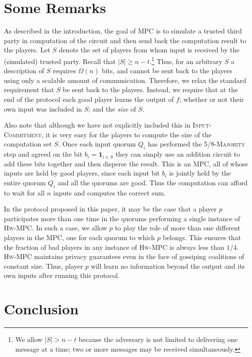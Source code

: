 \documentclass[10pt]{llncs}
\newcommand{\thresh}{5/8\xspace}
\newcommand{\hw}{\textsc{Hw-MPC}\xspace}
\newcommand{\ic}{\textsc{Input-Commitment}\xspace}
\newcommand{\maj}{\thresh-\textsc{Majority}\xspace}
\begin{document}
\section{Some Remarks} 
\label{s:dis}
As described in the introduction, the goal of MPC is to simulate a
trusted third party in computation of the circuit and then send back
the computation result to the players.  Let $S$ denote the set of
players from whom input is received by the (simulated) trusted
party. Recall that $|S| \ge n-t$.\footnote{We allow $|S| >
  n-t$ because the adversary is not limited to delivering one message
  at a time; two or more messages may be received simultaneously.}
Thus, for an arbitrary $S$ a description of $S$ requires $\Omega(n)$
bits, and cannot be sent back to the players using only a scalable
amount of communication. Therefore, we relax the standard requirement
that $S$ be sent back to the players.  Instead, we require that at the
end of the protocol each good player learns the output of $f$; whether
or not their own input was included in $S$; and the \emph{size} of
$S$.

Also note that although we have not explicitly included this in \ic,
it is very easy for the players to compute the size of the computation
set $S$. Once each input quorum $Q_i$ has performed the \maj step and
agreed on the bit $b_i = \mathbf{1}_{i \in S}$ they can simply use an 
addition circuit to add these bits together and then
disperse the result. This is an MPC, all
of whose inputs are held by good players, since each input bit $b_i$
is jointly held by the entire quorum $Q_i$ and all the quorums are
good. Thus the computation can afford to wait for all $n$ inputs and 
computes the correct sum.

In the protocol proposed in this paper, it may be the case that a
player $p$ participates more than one time in the quorums performing a
single instance of \hw. In such a case, we allow $p$ to play the role
of more than one different players in the MPC, one for each quorum to
which $p$ belongs. This ensures that the fraction of bad players in
any instance of \hw is always less than $1/4$. \hw maintains privacy
guarantees even in the face of gossiping coalitions of constant
size. Thus, player $p$ will learn no information beyond the output and
its own inputs after running this protocol.

\section{Conclusion} \label{sec:conclusion}
\end{document}
